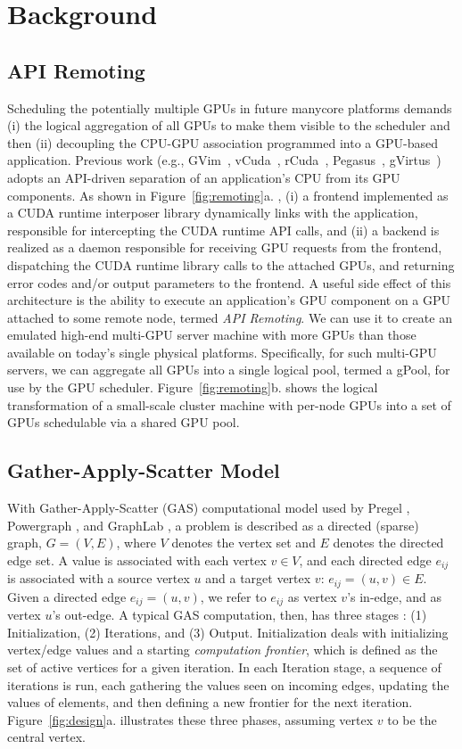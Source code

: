 

\section{Background}
\subsection{API Remoting}
Scheduling the potentially multiple GPUs in future manycore platforms demands (i) the logical aggregation of all GPUs to make them visible to the scheduler and then (ii) decoupling the CPU-GPU association programmed into a GPU-based application. Previous work (e.g., GVim~\cite{gvim}, vCuda~\cite{vcuda}, rCuda~\cite{rcuda}, Pegasus~\cite{pegasus}, gVirtus~\cite{gvirtus}) adopts an API-driven separation of an application’s CPU from its GPU components. As shown in Figure~\ref{fig:remoting}a. , (i) a frontend implemented as a CUDA runtime interposer library dynamically links with the application, responsible for intercepting the CUDA runtime API calls, and (ii) a backend is realized as a daemon responsible for receiving GPU requests from the frontend, dispatching the CUDA runtime library calls to the attached GPUs, and returning error codes and/or output parameters to the frontend. A useful side effect of this architecture is the ability to execute an application’s GPU component on a GPU attached to some remote node, termed \textit{API Remoting}. We can use it to create an emulated high-end multi-GPU server machine with more GPUs than those available on today’s single physical platforms. Specifically, for such multi-GPU servers, we can aggregate all GPUs into a single logical pool, termed a gPool, for use by the GPU scheduler. Figure~\ref{fig:remoting}b. shows the logical transformation of a small-scale cluster machine with per-node GPUs into a set of GPUs schedulable via a shared GPU pool.

\subsection{Gather-Apply-Scatter Model}
With Gather-Apply-Scatter (GAS) computational model used by Pregel \cite{pregel}, Powergraph \cite{powergraph}, and GraphLab \cite{graphlab}, a problem is described as a directed (sparse) graph, $G = (V, E)$, where $V$ denotes the vertex set and $E$ denotes 
the directed edge set. A value is associated with each vertex $v\in V$, and each directed edge $e_{ij}$ is associated with 
a source vertex $u$ and a target vertex $v$: $e_{ij} =(u, v) \in E$. Given a directed edge $e_{ij} = (u, v)$, we refer to 
$e_{ij}$ as vertex $v$'s in-edge, and as vertex $u$'s out-edge. A typical GAS computation, then, has three stages \cite{vertexapi}: 
(1) Initialization, (2) Iterations, and (3) Output. Initialization deals with initializing vertex/edge values and a starting 
{\em computation frontier}, which is defined as the set of active vertices for a given iteration. In each Iteration stage, 
a sequence of iterations is run, each gathering the values seen on incoming edges, updating the values of elements, and 
then defining a new frontier for the next iteration. Figure~\ref{fig:design}a. illustrates these three phases, assuming vertex $v$ to be the 
central vertex.


